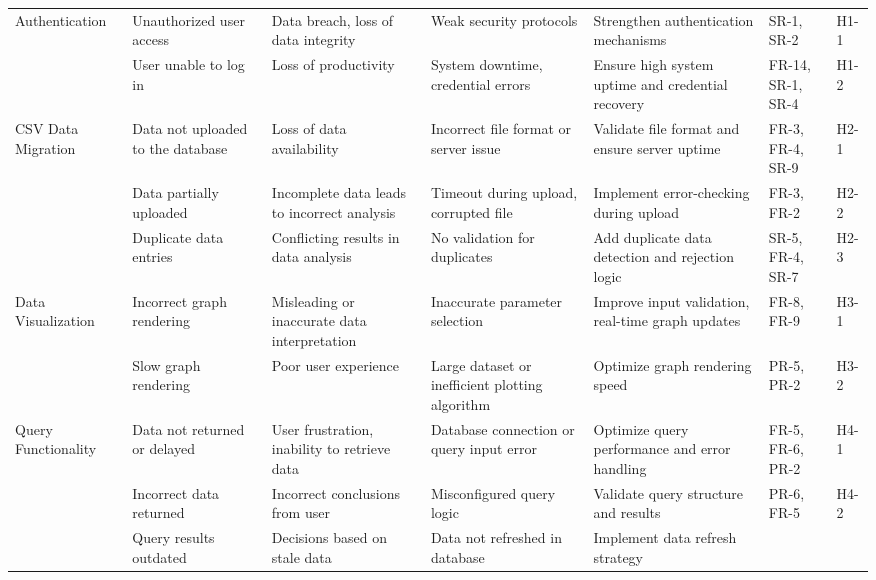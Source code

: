\documentclass{article}
\begin{document}
\begin{landscape}
\begin{longtable}{|p{2.5cm}|p{4cm}|p{4cm}|p{4cm}|p{4cm}|p{1.25cm}|p{1cm}|}
        \hline
        \endfoot
        Authentication & Unauthorized user access & Data breach, loss of data
        integrity & Weak security protocols & Strengthen authentication
        mechanisms & SR-1, SR-2 & H1-1 \\
        \cline{2-7}
        \texttt{} & User unable to log in & Loss of productivity & System
        downtime, credential errors & Ensure high system uptime and credential
        recovery & FR-14, SR-1, SR-4 & H1-2 \\
        \cline{1-7}
        CSV Data Migration & Data not uploaded to the database & Loss of data
        availability & Incorrect file format or server issue & Validate file
        format and ensure server uptime & FR-3, FR-4, SR-9 & H2-1 \\
        \cline{2-7}
        \texttt{} & Data partially uploaded & Incomplete data leads to incorrect
        analysis & Timeout during upload, corrupted file & Implement
        error-checking during upload & FR-3, FR-2 & H2-2 \\
        \cline{2-7}
        \texttt{} & Duplicate data entries & Conflicting results in data
        analysis & No validation for duplicates & Add duplicate data detection
        and rejection logic & SR-5, FR-4, SR-7 & H2-3 \\
        \cline{1-7}
        Data Visualization & Incorrect graph rendering & Misleading or
        inaccurate data interpretation & Inaccurate parameter selection &
        Improve input validation, real-time graph updates & FR-8, FR-9 & H3-1 \\
        \cline{2-7}
        \texttt{} & Slow graph rendering & Poor user experience & Large dataset
        or inefficient plotting algorithm & Optimize graph rendering speed &
        PR-5, PR-2 & H3-2 \\
        \cline{1-7}
        Query Functionality & Data not returned or delayed & User frustration,
        inability to retrieve data & Database connection or query input error &
        Optimize query performance and error handling & FR-5, FR-6, PR-2 & H4-1
        \\
        \cline{2-7}
        \texttt{} & Incorrect data returned & Incorrect conclusions from user &
        Misconfigured query logic & Validate query structure and results & PR-6,
        FR-5 & H4-2 \\
        \cline{2-7}
        \texttt{} & Query results outdated & Decisions based on stale data &
        Data not refreshed in database & Implement data refresh strategy &

\end{longtable}
\end{landscape}
\end{document}

